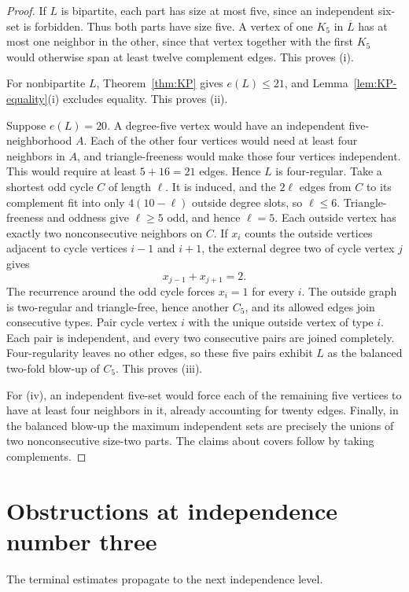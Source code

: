 \documentclass[11pt,reqno,a4paper]{amsart}
\theoremstyle{definition}
\theoremstyle{remark}
\newcommand{\comp}[1]{\overline{#1}}
\begin{document}
\begin{proof}
If $L$ is bipartite, each part has size at most five, since an independent
six-set is forbidden.  Thus both parts have size five.  A vertex of one
$K_5$ in $\comp L$ has at most one neighbor in the other, since that vertex
together with the first $K_5$ would otherwise span at least twelve
complement edges.  This proves (i).

For nonbipartite $L$, Theorem~\ref{thm:KP} gives $e(L)\leq21$, and
Lemma~\ref{lem:KP-equality}(i) excludes equality.  This proves (ii).

Suppose $e(L)=20$.  A degree-five vertex would have an independent
five-neighborhood $A$.  Each of the other four vertices would need at least
four neighbors in $A$, and triangle-freeness would make those four vertices
independent.  This would require at least $5+16=21$ edges.  Hence $L$ is
four-regular.  Take a shortest odd cycle $C$ of length $\ell$.  It is
induced, and the $2\ell$ edges from $C$ to its complement fit into only
$4(10-\ell)$ outside degree slots, so $\ell\leq6$.  Triangle-freeness and
oddness give $\ell\geq5$ odd, and hence $\ell=5$.  Each outside vertex has
exactly two nonconsecutive neighbors on $C$.  If $x_i$ counts the outside
vertices adjacent to cycle vertices $i-1$ and $i+1$, the external degree two
of cycle vertex $j$ gives
\[
  x_{j-1}+x_{j+1}=2.
\]
The recurrence around the odd cycle forces $x_i=1$ for every $i$.  The
outside graph is two-regular and triangle-free, hence another $C_5$, and
its allowed edges join consecutive types.  Pair cycle vertex $i$ with the
unique outside vertex of type $i$.  Each pair is independent, and every two
consecutive pairs are joined completely.  Four-regularity leaves no other
edges, so these five pairs exhibit $L$ as the balanced two-fold blow-up of
$C_5$.  This proves (iii).

For (iv), an independent five-set would force each of the remaining five
vertices to have at least four neighbors in it, already accounting for
twenty edges.  Finally, in the balanced blow-up the maximum independent
sets are precisely the unions of two nonconsecutive size-two parts.  The
claims about covers follow by taking complements.
\end{proof}

\section{Obstructions at independence number three}\label{sec:alpha3}

The terminal estimates propagate to the next independence level.
\end{document}
